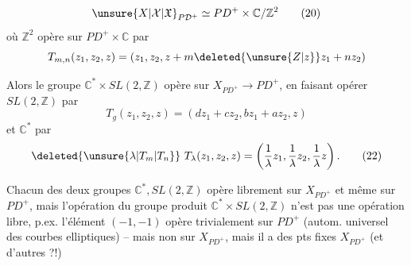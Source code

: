 \[
\unsure{X|\mathcal X|\mathfrak X}_{P\mathcal D^+}\simeq PD^+\times\mathbb C/\mathbb Z^2\tag*{(20)}
\]
où $\mathbb Z^2$ opère sur $PD^+\times\mathbb C$ par
\[
T_{m,n}(z_1,z_2,z)=(z_1,z_2,z+m\deleted{\unsure{Z|z}}z_1+nz_2)
\]

Alors le groupe $\mathbb C^*\times SL(2,\mathbb Z)$ opère sur $X_{PD^+}\longrightarrow PD^+$, en faisant opérer $SL(2,\mathbb Z)$ par
\[
T_g(z_1,z_2,z)=(dz_1+cz_2,bz_1+az_2,z)\tag*{(21)}
\]
et $\mathbb C^*$  par
\[
\deleted{\unsure{\lambda|T_m|T_n}}\ T_\lambda(z_1,z_2,z)=\left(\frac{1}{\lambda}z_1,\frac{1}{\lambda}z_2,\frac{1}{\lambda}z\right).\tag*{(22)}
\]

Chacun des deux groupes  $\mathbb C^*,SL(2,\mathbb Z)$ opère librement sur $X_{PD^+}$ et même sur $PD^+$, mais l'opération du groupe produit $\mathbb C^*\times SL(2,\mathbb Z)$  n'est pas une opération libre, p.ex. l'élément $(-1,-1)$ opère trivialement sur $PD^+$ (autom. universel des courbes elliptiques) -- mais non sur $X_{PD^+}$, mais il  a des pts fixes  $X_{PD^+}$ (et d'autres ?!)


